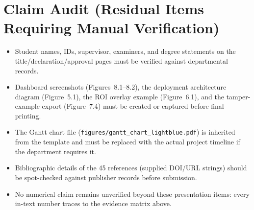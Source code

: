 \section{Claim Audit (Residual Items Requiring Manual Verification)}

\begin{itemize}
\item Student names, IDs, supervisor, examiners, and degree statements on the title/declaration/approval pages must be verified against departmental records.
\item Dashboard screenshots (Figures~8.1--8.2), the deployment architecture diagram (Figure~5.1), the ROI overlay example (Figure~6.1), and the tamper-example export (Figure~7.4) must be created or captured before final printing.
\item The Gantt chart file (\texttt{figures/gantt\_chart\_lightblue.pdf}) is inherited from the template and must be replaced with the actual project timeline if the department requires it.
\item Bibliographic details of the 45 references (supplied DOI/URL strings) should be spot-checked against publisher records before submission.
\item No numerical claim remains unverified beyond these presentation items: every in-text number traces to the evidence matrix above.
\end{itemize}
